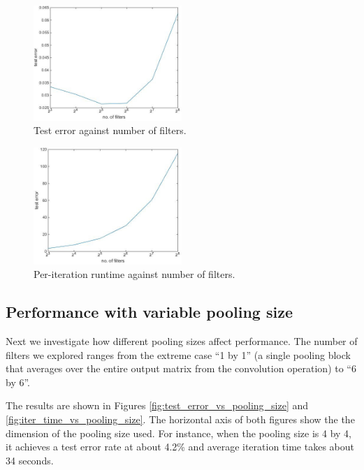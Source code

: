\documentclass[10pt,twocolumn]{article}
\begin{document}
\begin{figure}
\centering
\includegraphics[width = 0.5\textwidth]{figure/test_error_vs_no_of_filters}
\caption{Test error against number of filters.}
\label{fig:test_error_vs_no_of_filters}
\end{figure}

\begin{figure}
\centering
\includegraphics[width = 0.5\textwidth]{figure/iter_time_vs_no_of_filters}
\caption{Per-iteration runtime against number of filters.}
\label{fig:iter_time_vs_no_of_filters}
\end{figure}

\subsection{Performance with variable pooling size}

Next we investigate how different pooling sizes affect performance. The number of filters we explored ranges from the extreme case ``1 by 1'' (a single pooling block that averages over the entire output matrix from the convolution operation) to ``6 by 6''.

The results are shown in Figures \ref{fig:test_error_vs_pooling_size} and \ref{fig:iter_time_vs_pooling_size}. The horizontal axis of both figures show the the dimension of the pooling size used. For instance, when the pooling size is 4 by 4, it achieves a test error rate at about 4.2\% and average iteration time takes about 34 seconds.
\end{document}
